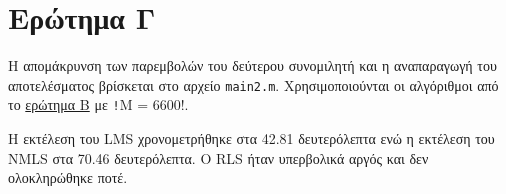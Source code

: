 \section{Ερώτημα Γ}
Η απομάκρυνση των παρεμβολών του δεύτερου συνομιλητή και η αναπαραγωγή του αποτελέσματος βρίσκεται στο αρχείο \texttt{main2.m}. Χρησιμοποιούνται οι αλγόριθμοι από το
\hyperref[section:B]{ερώτημα Β} με
\texttt!M = 6600!.

Η εκτέλεση του LMS χρονομετρήθηκε στα 42.81 δευτερόλεπτα ενώ η εκτέλεση του NMLS στα 70.46 δευτερόλεπτα.
Ο RLS ήταν υπερβολικά αργός και δεν ολοκληρώθηκε ποτέ.
